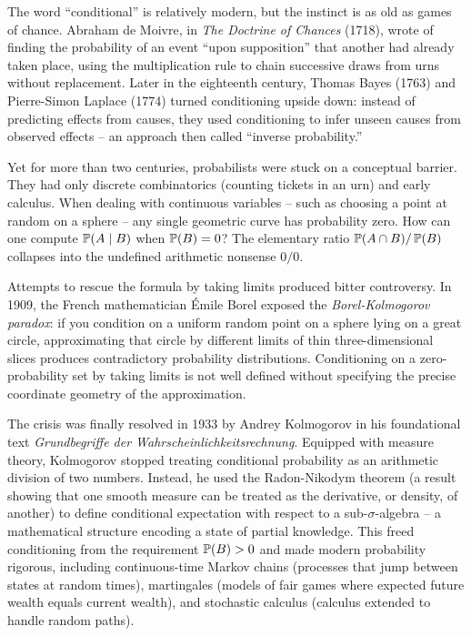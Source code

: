 \begin{historybox}
The word ``conditional'' is relatively modern, but the instinct is as old as games of chance. Abraham de Moivre, in \emph{The Doctrine of Chances} (1718), wrote of finding the probability of an event ``upon supposition'' that another had already taken place, using the multiplication rule to chain successive draws from urns without replacement. Later in the eighteenth century, Thomas Bayes (1763) and Pierre-Simon Laplace (1774) turned conditioning upside down: instead of predicting effects from causes, they used conditioning to infer unseen causes from observed effects -- an approach then called ``inverse probability.''

Yet for more than two centuries, probabilists were stuck on a conceptual barrier. They had only discrete combinatorics (counting tickets in an urn) and early calculus. When dealing with continuous variables -- such as choosing a point at random on a sphere -- any single geometric curve has probability zero. How can one compute $\P(A \given B)$ when $\P(B) = 0$? The elementary ratio $\P(A \cap B)/\P(B)$ collapses into the undefined arithmetic nonsense $0/0$.

Attempts to rescue the formula by taking limits produced bitter controversy. In 1909, the French mathematician \'{E}mile Borel exposed the \emph{Borel-Kolmogorov paradox}: if you condition on a uniform random point on a sphere lying on a great circle, approximating that circle by different limits of thin three-dimensional slices produces contradictory probability distributions. Conditioning on a zero-probability set by taking limits is not well defined without specifying the precise coordinate geometry of the approximation.

The crisis was finally resolved in 1933 by Andrey Kolmogorov in his foundational text \emph{Grundbegriffe der Wahrscheinlichkeitsrechnung}. Equipped with measure theory, Kolmogorov stopped treating conditional probability as an arithmetic division of two numbers. Instead, he used the Radon-Nikodym theorem (a result showing that one smooth measure can be treated as the derivative, or density, of another) to define conditional expectation with respect to a sub-$\sigma$-algebra -- a mathematical structure encoding a state of partial knowledge. This freed conditioning from the requirement $\P(B) > 0$ and made modern probability rigorous, including continuous-time Markov chains (processes that jump between states at random times), martingales (models of fair games where expected future wealth equals current wealth), and stochastic calculus (calculus extended to handle random paths).


\end{historybox}
